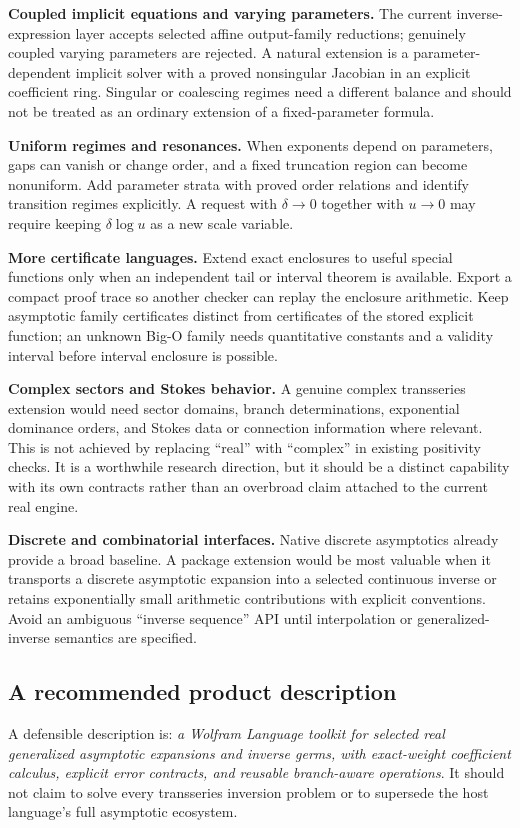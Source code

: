 \documentclass[11pt,a4paper]{article}
\theoremstyle{remark}\newtheorem{remark}[proposition]{Remark}
\begin{document}
\textbf{Coupled implicit equations and varying parameters.} The current inverse-expression layer accepts selected affine output-family reductions; genuinely coupled varying parameters are rejected. A natural extension is a parameter-dependent implicit solver with a proved nonsingular Jacobian in an explicit coefficient ring. Singular or coalescing regimes need a different balance and should not be treated as an ordinary extension of a fixed-parameter formula.\cite{inverseexpressions}

\textbf{Uniform regimes and resonances.} When exponents depend on parameters, gaps can vanish or change order, and a fixed truncation region can become nonuniform. Add parameter strata with proved order relations and identify transition regimes explicitly. A request with $\delta\to0$ together with $u\to0$ may require keeping $\delta\log u$ as a new scale variable.

\textbf{More certificate languages.} Extend exact enclosures to useful special functions only when an independent tail or interval theorem is available. Export a compact proof trace so another checker can replay the enclosure arithmetic. Keep asymptotic family certificates distinct from certificates of the stored explicit function; an unknown Big-O family needs quantitative constants and a validity interval before interval enclosure is possible.

\textbf{Complex sectors and Stokes behavior.} A genuine complex transseries extension would need sector domains, branch determinations, exponential dominance orders, and Stokes data or connection information where relevant. This is not achieved by replacing ``real'' with ``complex'' in existing positivity checks. It is a worthwhile research direction, but it should be a distinct capability with its own contracts rather than an overbroad claim attached to the current real engine.

\textbf{Discrete and combinatorial interfaces.} Native discrete asymptotics already provide a broad baseline. A package extension would be most valuable when it transports a discrete asymptotic expansion into a selected continuous inverse or retains exponentially small arithmetic contributions with explicit conventions. Avoid an ambiguous ``inverse sequence'' API until interpolation or generalized-inverse semantics are specified.\cite{wl-discrete}

\subsection{A recommended product description}
A defensible description is: \emph{a Wolfram Language toolkit for selected real generalized asymptotic expansions and inverse germs, with exact-weight coefficient calculus, explicit error contracts, and reusable branch-aware operations}. It should not claim to solve every transseries inversion problem or to supersede the host language's full asymptotic ecosystem.
\end{document}
